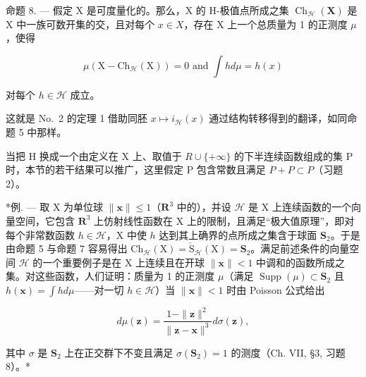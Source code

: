 命题 8. --- 假定 X 是可度量化的。那么，X 的 H-极值点所成之集 \(\operatorname{Ch}_{\mathcal{H}}(\mathbf{X})\) 是 X 中一族可数开集的交，且对每个 \(x \in X\)，存在 X 上一个总质量为 1 的正测度 \(\mu\)，使得

\[
\mu (\mathrm{X} - \mathrm{Ch} _ {\mathcal {H}} (\mathrm{X})) = 0 \text { and } \int h d \mu = h (x)
\]

对每个 \(h \in \mathcal{H}\) 成立。

这就是 No.~2 的定理 1 借助同胚 \(x \mapsto i_{\mathcal{H}}(x)\) 通过结构转移得到的翻译，如同命题 5 中那样。

当把 H 换成一个由定义在 X 上、取值于 \(R \cup \{+\infty\}\) 的下半连续函数组成的集 P 时，本节的若干结果可以推广，这里假定 P 包含常数且满足 \(P + P \subset P\)（习题 2）。

*例. --- 取 X 为单位球 \(\| \mathbf{x} \| \leqslant 1\)（\(\mathbf{R}^3\) 中的），并设 \(\mathcal{H}\) 是 X 上连续函数的一个向量空间，它包含 \(\mathbf{R}^3\) 上仿射线性函数在 X 上的限制，且满足“极大值原理”，即对每个非常数函数 \(h \in \mathcal{H}\)，X 中使 \(h\) 达到其上确界的点所成之集含于球面 \(\mathbf{S}_2\)。于是由命题 5 与命题 7 容易得出 \(\mathrm{Ch}_{\mathcal{H}}(\mathrm{X}) = \check{\mathrm{S}}_{\mathcal{H}}(\mathrm{X}) = \mathbf{S}_2\)。满足前述条件的向量空间 \(\mathcal{H}\) 的一个重要例子是在 X 上连续且在开球 \(\| \mathbf{x} \| < 1\) 中调和的函数所成之集。对这些函数，人们证明：质量为 1 的正测度 \(\mu\)（满足 \(\operatorname{Supp}(\mu) \subset \mathbf{S}_2\) 且 \(h(\mathbf{x}) = \int h d\mu\)——对一切 \(h \in \mathcal{H}\)）当 \(\| \mathbf{x} \| < 1\) 时由 Poisson 公式给出

\[
d \mu (\mathbf {z}) = \frac {1 - \| \mathbf {z} \| ^ {2}}{\| \mathbf {z} - \mathbf {x} \| ^ {3}} d \sigma (\mathbf {z}),
\]

其中 \(\sigma\) 是 \(\mathbf{S}_2\) 上在正交群下不变且满足 \(\sigma(\mathbf{S}_2) = 1\) 的测度（Ch. VII, §3, 习题 8）。*

